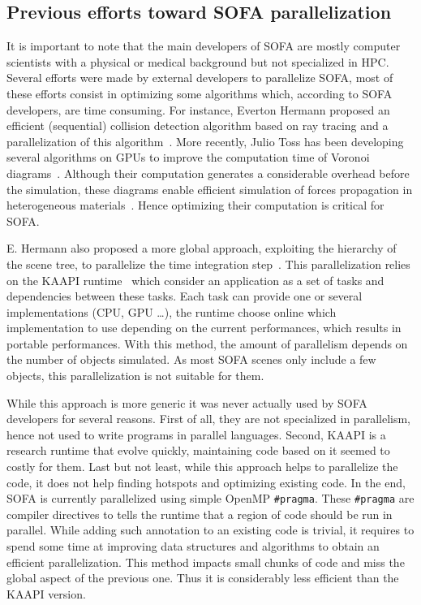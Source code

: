\subsection{Previous efforts toward SOFA parallelization}

It is important to note that the main developers of \gls{SOFA} are  mostly computer scientists with a physical or medical background but not specialized in \gls{HPC}.
Several efforts were made by external developers to parallelize \gls{SOFA}, most of these efforts consist in optimizing some algorithms which, according to \gls{SOFA} developers, are time consuming.
For instance, Everton Hermann proposed an efficient (sequential) collision detection algorithm based on ray tracing and a parallelization of this algorithm~\cite{Hermann08Raytraced}.
More recently, Julio Toss has been developing several algorithms on \glspl{GPU} to improve the computation time of Voronoi diagrams~\cite{Toss13Parallel,Toss14Parallel}.
Although their computation generates a considerable overhead before the simulation, these diagrams enable efficient simulation of forces propagation in heterogeneous materials~\cite{Faure11Sparse}.
Hence optimizing their computation is critical for \gls{SOFA}.

E. Hermann also proposed a more global approach, exploiting the hierarchy of the scene tree, to parallelize the time integration step~\cite{Hermann09Interactive}.
This parallelization relies on the \gls{KAAPI} runtime~\cite{Gautier07KAAPI} which consider an application as a set of tasks and dependencies between these tasks.
Each task can provide one or several implementations (\gls{CPU}, \gls{GPU} \ldots), the runtime choose online which implementation to use depending on the current performances, which results in portable performances.
With this method, the amount of parallelism depends on the number of objects simulated.
As  most \gls{SOFA} scenes only include a few objects, this parallelization is not suitable for them.

While this approach is more generic it was never actually used by \gls{SOFA} developers for several reasons.
First of all, they are not specialized in parallelism, hence not used to write programs in parallel languages.
Second, \gls{KAAPI} is a research runtime that evolve quickly, maintaining code based on it seemed to costly for them.
Last but not least, while this approach helps to parallelize the code, it does not help finding hotspots and optimizing existing code.
In the end, \gls{SOFA} is currently parallelized using simple \gls{OpenMP} \texttt{\#pragma}.
These  \texttt{\#pragma} are compiler directives to tells the runtime that a region of code should be run in parallel.
While adding such annotation to an existing code is trivial, it requires to spend some time at improving data structures and algorithms to obtain an efficient parallelization.
This method impacts small chunks of code and miss the global aspect of the previous one.
Thus it is considerably less efficient than the \gls{KAAPI} version.

